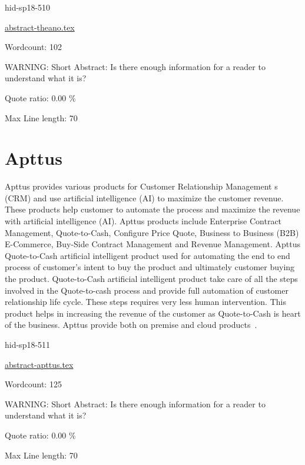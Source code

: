 \begin{IU}

hid-sp18-510

\href{https://github.com/cloudmesh-community/hid-sp18-510/blob/master//technology/abstract-theano.tex}{abstract-theano.tex}

 

Wordcount: 102

WARNING: Short Abstract: Is there enough information for a reader to understand what it is?


Quote ratio: 0.00 \%
 
Max Line length: 70
\end{IU}

\section{Apttus}

Apttus provides various products for Customer Relationship Management
s (CRM) and use artificial intelligence (AI) to maximize the customer
revenue. These products help customer to automate the process and
maximize the revenue with artificial intelligence (AI). Apttus
products include Enterprise Contract Management, Quote-to-Cash,
Configure Price Quote, Business to Business (B2B) E-Commerce, Buy-Side
Contract Management and Revenue Management. Apttus Quote-to-Cash
artificial intelligent product used for automating the end to end
process of customer's intent to buy the product and ultimately
customer buying the product. Quote-to-Cash artificial intelligent
product take care of all the steps involved in the Quote-to-cash
process and provide full automation of customer relationship life
cycle. These steps requires very less human intervention. This product
helps in increasing the revenue of the customer as Quote-to-Cash is
heart of the business. Apttus provide both on premise and cloud
products~\cite{hid-sp18-511-apttus}.
 


\begin{IU}

hid-sp18-511

\href{https://github.com/cloudmesh-community/hid-sp18-511/blob/master//technology/abstract-apttus.tex}{abstract-apttus.tex}

 

Wordcount: 125

WARNING: Short Abstract: Is there enough information for a reader to understand what it is?


Quote ratio: 0.00 \%
 
Max Line length: 70
\end{IU}

